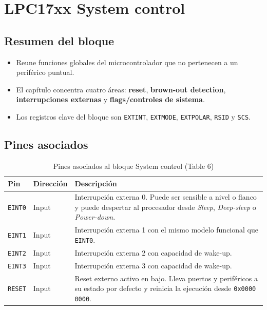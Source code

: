 \setcounter{section}{2}
\section{LPC17xx System control}

\subsection{Resumen del bloque}
\begin{itemize}
  \item Reune funciones globales del microcontrolador que no pertenecen a un perif\'erico puntual.
  \item El cap\'itulo concentra cuatro \'areas: \textbf{reset}, \textbf{brown-out detection}, \textbf{interrupciones externas} y \textbf{flags/controles de sistema}.
  \item Los registros clave del bloque son \texttt{EXTINT}, \texttt{EXTMODE}, \texttt{EXTPOLAR}, \texttt{RSID} y \texttt{SCS}.
\end{itemize}

\subsection{Pines asociados}
\begin{table}[H]
  \centering
  \small
  \renewcommand{\arraystretch}{1.15}
  \caption{Pines asociados al bloque System control (Table 6)}
  \begin{tabularx}{0.96\textwidth}{|>{\raggedright\arraybackslash}p{}|>{\centering\arraybackslash}p{}|>{\raggedright\arraybackslash}X|}
    \hline
    \textbf{Pin} & \textbf{Direcci\'on} & \textbf{Descripci\'on} \\
    \hline
    \texttt{EINT0} & Input & Interrupci\'on externa 0. Puede ser sensible a nivel o flanco y puede despertar al procesador desde \textit{Sleep}, \textit{Deep-sleep} o \textit{Power-down}. \\
    \hline
    \texttt{EINT1} & Input & Interrupci\'on externa 1 con el mismo modelo funcional que \texttt{EINT0}. \\
    \hline
    \texttt{EINT2} & Input & Interrupci\'on externa 2 con capacidad de wake-up. \\
    \hline
    \texttt{EINT3} & Input & Interrupci\'on externa 3 con capacidad de wake-up. \\
    \hline
    \texttt{RESET} & Input & Reset externo activo en bajo. Lleva puertos y perif\'ericos a su estado por defecto y reinicia la ejecuci\'on desde \texttt{0x0000 0000}. \\
    \hline
  \end{tabularx}
\end{table}

